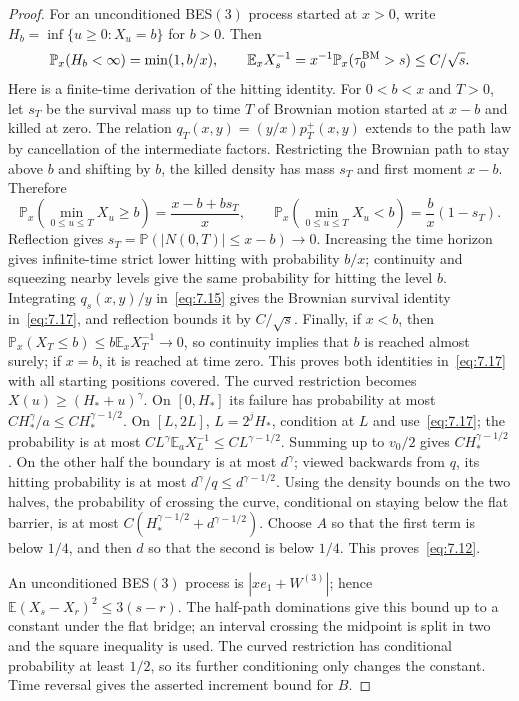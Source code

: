 \documentclass[11pt,letterpaper,reqno]{amsart}
\numberwithin{equation}{section}
\theoremstyle{remark}
\begin{document}
\begin{proof}
For an unconditioned BES$(3)$ process started at $x>0$, write $H_b=\inf\{u\ge0:X_u=b\}$ for $b>0$. Then
\begin{equation}\label{eq:7.17}
\mathbb P_x(H_b<\infty)=\min(1,b/x),\qquad
\mathbb E_x X_s^{-1}
=x^{-1}\mathbb P_x(\tau_0^{\rm BM}>s)\le C/\sqrt s.
\end{equation}
Here is a finite-time derivation of the hitting identity. For $0<b<x$ and $T>0$, let $s_T$ be the survival mass up to time $T$ of Brownian motion started at $x-b$ and killed at zero. The relation $q_T(x,y)=(y/x)p_T^+(x,y)$ extends to the path law by cancellation of the intermediate factors. Restricting the Brownian path to stay above $b$ and shifting by $b$, the killed density has mass $s_T$ and first moment $x-b$. Therefore
\[
\mathbb P_x\!\left(\min_{0\le u\le T}X_u\ge b\right)
=\frac{x-b+b s_T}{x},\qquad
\mathbb P_x\!\left(\min_{0\le u\le T}X_u<b\right)
=\frac bx(1-s_T).
\]
Reflection gives $s_T=\mathbb P(|N(0,T)|\le x-b)\to0$. Increasing the time horizon gives infinite-time strict lower hitting with probability $b/x$; continuity and squeezing nearby levels give the same probability for hitting the level $b$. Integrating $q_s(x,y)/y$ in~\eqref{eq:7.15} gives the Brownian survival identity in~\eqref{eq:7.17}, and reflection bounds it by $C/\sqrt s$. Finally, if $x<b$, then $\mathbb P_x(X_T\le b)\le b\mathbb E_xX_T^{-1}\to0$, so continuity implies that $b$ is reached almost surely; if $x=b$, it is reached at time zero. This proves both identities in~\eqref{eq:7.17} with all starting positions covered.
The curved restriction becomes $X(u)\ge(H_*+u)^\gamma$.
On $[0,H_*]$ its failure has probability at most $CH_*^\gamma/a\le CH_*^{\gamma-1/2}$.
On $[L,2L]$, $L=2^jH_*$, condition at $L$ and use~\eqref{eq:7.17}; the probability is at most $CL^\gamma\mathbb E_aX_L^{-1}\le CL^{\gamma-1/2}$.
Summing up to $v_0/2$ gives $CH_*^{\gamma-1/2}$.
On the other half the boundary is at most $d^\gamma$; viewed backwards from $q$, its hitting probability is at most $d^\gamma/q\le d^{\gamma-1/2}$.
Using the density bounds on the two halves, the probability of crossing the curve, conditional on staying below the flat barrier, is at most
$C(H_*^{\gamma-1/2}+d^{\gamma-1/2})$.
Choose $A$ so that the first term is below $1/4$, and then $d$ so that the second is below $1/4$. This proves~\eqref{eq:7.12}.

An unconditioned BES$(3)$ process is $|x e_1+W^{(3)}|$; hence
$\mathbb E(X_s-X_r)^2\le3(s-r)$.
The half-path dominations give this bound up to a constant under the flat bridge; an interval crossing the midpoint is split in two and the square inequality is used. The curved restriction has conditional probability at least $1/2$, so its further conditioning only changes the constant. Time reversal gives the asserted increment bound for $B$.
\end{proof}
\end{document}
